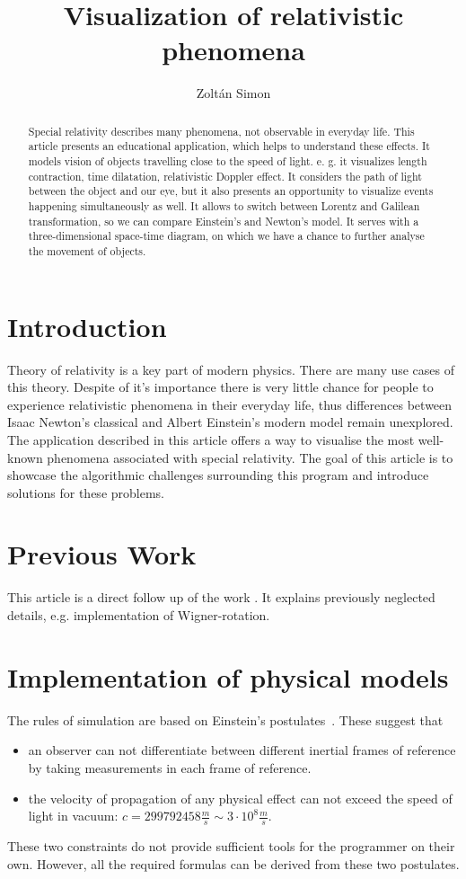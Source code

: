\documentclass{egpubl}
\title[Visualization of relativity]{Visualization of relativistic phenomena}
\author{Zoltán Simon}
\begin{document}
\maketitle

\begin{abstract}
Special relativity describes many phenomena, not observable in everyday life. This article presents an educational application, which helps to understand these effects. It models vision of objects travelling close to the speed of light. e. g. it visualizes length contraction, time dilatation, relativistic Doppler effect. It considers the path of light between the object and our eye, but it also presents an opportunity to visualize events happening simultaneously as well. It allows to switch between Lorentz and Galilean transformation, so we can compare Einstein's and Newton's model. It serves with a three-dimensional space-time diagram, on which we have a chance to further analyse the movement of objects.
\end{abstract}

\section{Introduction}
Theory of relativity is a key part of modern physics. There are many use cases of this theory. Despite of it's importance there is very little chance for people to experience relativistic phenomena in their everyday life, thus differences between Isaac Newton's classical and Albert Einstein's modern model remain unexplored. The application described in this article offers a way to visualise the most well-known phenomena associated with special relativity. The goal of this article is to showcase the algorithmic challenges surrounding this program and introduce solutions for these problems. 

\section{Previous Work}

This article is a direct follow up of the work \cite{TDKreport}. It explains previously neglected details, e.g. implementation of Wigner-rotation. 

\section{Implementation of physical models}
The rules of simulation are based on Einstein's postulates~\cite{EinsteinElectrodynamics}. These suggest that
\begin{itemize}
\item an observer can not differentiate between different inertial frames of reference by taking measurements in each frame of reference.
\item the velocity of propagation of any physical effect can not exceed
the speed of light in vacuum: $c=299792458 \frac{m}{s} \sim 3 \cdot 10^8 \frac{m}{s}$.
 \end{itemize}
These two constraints do not provide sufficient tools for the programmer on their own. However, all the required formulas can be derived from these two postulates.
\end{document}
